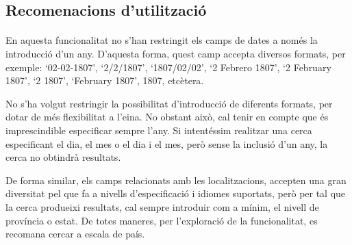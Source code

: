 \subsection{Recomenacions d'utilització}

    \paragraph{}
    En aquesta funcionalitat no s'han restringit els camps de dates a només la introducció d'un any. D'aquesta forma, quest camp accepta diversos formats, per exemple: `02-02-1807', `2/2/1807', `1807/02/02', `2 Febrero 1807', `2 February 1807', `2 1807', `February 1807', 1807, etcètera.

    No s'ha volgut restringir la possibilitat d'introducció de diferents formats, per dotar de més flexibilitat a l'eina. No obstant això, cal tenir en compte que és imprescindible especificar sempre l'any. Si intentéssim realitzar una cerca especificant el dia, el mes o el dia i el mes, però sense la inclusió d'un any, la cerca no obtindrà resultats.

    De forma similar, els camps relacionats amb les localitzacions, accepten una gran diversitat pel que fa a nivells d'especificació i idiomes suportats, però per tal que la cerca produeixi resultats, cal sempre introduir com a mínim, el nivell de província o estat. De totes maneres, per l'exploració de la funcionalitat, es recomana cercar a escala de país.
